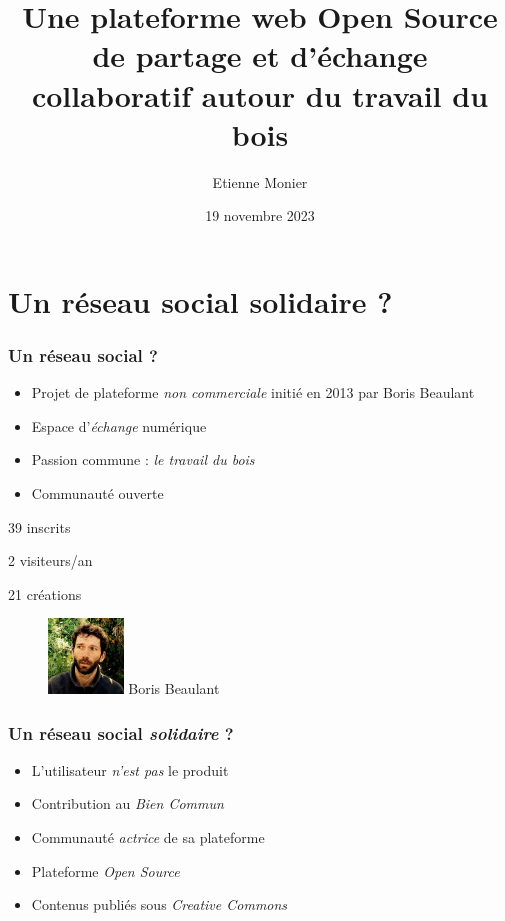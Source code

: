 

\title{Une plateforme web Open Source de partage et d'échange collaboratif autour du travail du bois }
\author{Etienne Monier}
\date{19 novembre 2023}



\begin{frame}[plain]
  \titlepage
\end{frame}

\section{Un réseau social solidaire ?}

\begin{frame}
\frametitle{Un réseau social ?}

\begin{itemize}
  \item Projet de plateforme \emph{non commerciale} initié en 2013 par Boris Beaulant
  \item Espace d'\emph{échange} numérique
  \item Passion commune : \emph{le travail du bois}
  \item Communauté ouverte
\end{itemize}

\bigskip

\begin{minipage}{0.45\textwidth}
  {\small
  39 inscrits

  2 visiteurs/an

  21 créations
  }
\end{minipage}
\begin{minipage}{0.45\textwidth}
  \begin{figure}
    \includegraphics[width=2cm]{img/boris.jpg}
    {\center\small Boris Beaulant}
  \end{figure}
\end{minipage}
\end{frame}

\begin{frame}
\frametitle{Un réseau social \emph{solidaire} ?}

\begin{itemize}
  \item L'utilisateur \emph{n'est pas} le produit
  \item Contribution au \emph{Bien Commun}
  \item Communauté \emph{actrice} de sa plateforme
  \item Plateforme \emph{Open Source}
  \item Contenus publiés sous \emph{Creative Commons}
\end{itemize}
\end{frame}

